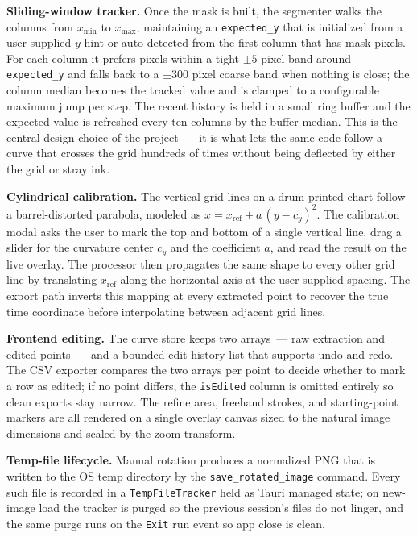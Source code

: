 \documentclass[a4paper,12pt]{report}
\begin{document}
\textbf{Sliding-window tracker.} Once the mask is built, the segmenter walks the columns from $x_{\min}$ to $x_{\max}$, maintaining an \texttt{expected\_y} that is initialized from a user-supplied $y$-hint or auto-detected from the first column that has mask pixels. For each column it prefers pixels within a tight $\pm 5$ pixel band around \texttt{expected\_y} and falls back to a $\pm 300$ pixel coarse band when nothing is close; the column median becomes the tracked value and is clamped to a configurable maximum jump per step. The recent history is held in a small ring buffer and the expected value is refreshed every ten columns by the buffer median. This is the central design choice of the project~--- it is what lets the same code follow a curve that crosses the grid hundreds of times without being deflected by either the grid or stray ink.

\textbf{Cylindrical calibration.} The vertical grid lines on a drum-printed chart follow a barrel-distorted parabola, modeled as $x = x_{\text{ref}} + a\,(y - c_y)^2$. The calibration modal asks the user to mark the top and bottom of a single vertical line, drag a slider for the curvature center $c_y$ and the coefficient $a$, and read the result on the live overlay. The processor then propagates the same shape to every other grid line by translating $x_{\text{ref}}$ along the horizontal axis at the user-supplied spacing. The export path inverts this mapping at every extracted point to recover the true time coordinate before interpolating between adjacent grid lines.

\textbf{Frontend editing.} The curve store keeps two arrays~--- raw extraction and edited points~--- and a bounded edit history list that supports undo and redo. The CSV exporter compares the two arrays per point to decide whether to mark a row as edited; if no point differs, the \texttt{isEdited} column is omitted entirely so clean exports stay narrow. The refine area, freehand strokes, and starting-point markers are all rendered on a single overlay canvas sized to the natural image dimensions and scaled by the zoom transform.

\textbf{Temp-file lifecycle.} Manual rotation produces a normalized PNG that is written to the OS temp directory by the \texttt{save\_rotated\_image} command. Every such file is recorded in a \texttt{TempFileTracker} held as Tauri managed state; on new-image load the tracker is purged so the previous session's files do not linger, and the same purge runs on the \texttt{Exit} run event so app close is clean.
\end{document}
